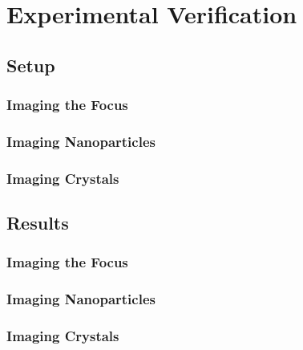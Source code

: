 \chapter{Experimental Verification}
\section{Setup}

\subsection{Imaging the Focus}
\subsection{Imaging Nanoparticles}
\subsection{Imaging Crystals}

\section{Results}
\subsection{Imaging the Focus}
\subsection{Imaging Nanoparticles}
\subsection{Imaging Crystals}

